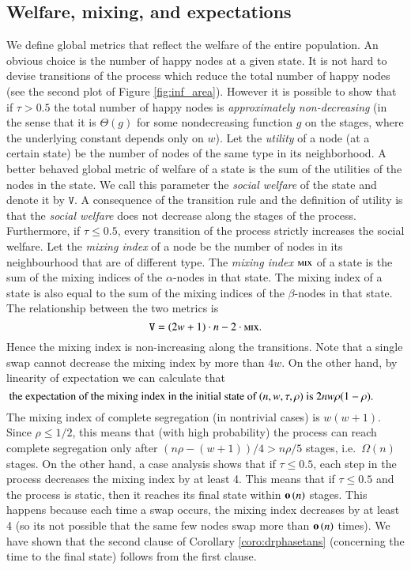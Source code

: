 \documentclass[11pt]{article}
\theoremstyle{plain}
\numberwithin{equation}{subsection}
\newcommand{\smo}[1]{\mathop{\bf o}\/\left({#1}\right)}
\newcommand{\mix}{\textsc{mix}}
\begin{document}
\subsection{Welfare, mixing, and expectations}
We define
global metrics that reflect the welfare of the entire population. An obvious choice
is the number of happy nodes at a given state. It is not hard to devise 
transitions of the process which reduce the total number of happy nodes 
(see the second plot of Figure \ref{fig:inf_area}).
However it is possible to show that if $\tau>0.5$ the
total number of happy nodes is {\em approximately non-decreasing} (in the sense that it is $\Theta(g)$ for some nondecreasing function $g$ 
on the stages, where the underlying constant depends only on $w$).
Let the {\em utility} of a node (at a certain state) be the number of nodes of the same type in its neighborhood.
A better behaved global metric of welfare 
of a state is the sum of the
utilities of the nodes in the state.
We call this parameter the {\em social welfare} 
of the state and denote it by $\mathtt{V}$. 
A consequence of the transition rule and the definition of utility is
 that the {\em social welfare} 
 does not decrease along the stages of the process.
Furthermore, 
if $\tau\leq 0.5$, every transition of the process strictly increases the social welfare.
Let the {\em mixing index} of a node be the number of nodes in its neighbourhood
that are of different type.
The {\em mixing index} $\mix$ of a state is the sum of the mixing indices
of the $\alpha$-nodes in that state. The mixing index of a state is also equal to the
sum of the mixing indices
of the $\beta$-nodes in that state.
The relationship between the two metrics is
\[
\mathtt{V}= (2w+1)\cdot n - 2\cdot \mix.
\]
Hence the mixing index is non-increasing along the transitions.
Note that a single swap cannot decrease the mixing index by more than $4w$. On the other hand, 
by linearity of expectation we can calculate that
 \begin{equation*}\parbox{12.5cm}{the expectation of the mixing index in the initial state of $(n,w,\tau,\rho)$ is
$2nw\rho(1-\rho)$.}
\end{equation*}
The mixing index of complete segregation (in nontrivial cases) is
$w(w+1)$.
Since $\rho\leq 1/2$, this means that (with high probability) the process can reach complete segregation only
after $(n\rho-(w+1))/4 >n\rho/5$ stages, i.e.\ $\Omega(n)$ stages. 
On the other hand, a case analysis shows that if $\tau\leq 0.5$, each step in the process
decreases the mixing index by at least 4.
This means that if $\tau\leq 0.5$ and the process is static, then it reaches its final state within 
$\smo{n}$ stages. 
This happens because each time a swap occurs, the mixing index decreases by at least 4
(so its not possible that the same few nodes swap more than $\smo{n}$ times).
We have shown that the second clause of Corollary
\ref{coro:drphasetans} (concerning the time to the final state) follows from the first clause.
\end{document}
